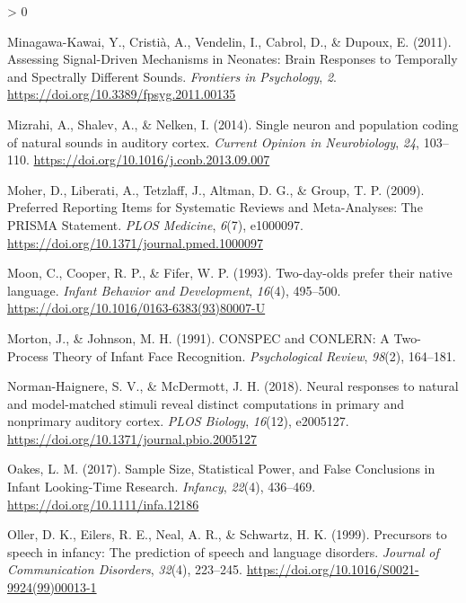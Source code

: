 \documentclass[
  english,
  man]{apa6}
\newlength{\cslhangindent}
\newenvironment{CSLReferences}[2] %
 {%
  \setlength{\parindent}{0pt}
  \ifodd #1 \everypar{\setlength{\hangindent}{\cslhangindent}}\ignorespaces\fi
  \ifnum #2 > 0
  \setlength{\parskip}{#2\baselineskip}
  \fi
 }%
 {}
\begin{document}
\begin{CSLReferences}{1}{0}
\leavevmode\hypertarget{ref-minagawa-kawai_assessing_2011}{}%
Minagawa-Kawai, Y., Cristià, A., Vendelin, I., Cabrol, D., \& Dupoux, E. (2011). Assessing {Signal}-{Driven} {Mechanisms} in {Neonates}: {Brain} {Responses} to {Temporally} and {Spectrally} {Different} {Sounds}. \emph{Frontiers in Psychology}, \emph{2}. \url{https://doi.org/10.3389/fpsyg.2011.00135}

\leavevmode\hypertarget{ref-mizrahi_single_2014}{}%
Mizrahi, A., Shalev, A., \& Nelken, I. (2014). Single neuron and population coding of natural sounds in auditory cortex. \emph{Current Opinion in Neurobiology}, \emph{24}, 103--110. \url{https://doi.org/10.1016/j.conb.2013.09.007}

\leavevmode\hypertarget{ref-moher_preferred_2009}{}%
Moher, D., Liberati, A., Tetzlaff, J., Altman, D. G., \& Group, T. P. (2009). Preferred {Reporting} {Items} for {Systematic} {Reviews} and {Meta}-{Analyses}: {The} {PRISMA} {Statement}. \emph{PLOS Medicine}, \emph{6}(7), e1000097. \url{https://doi.org/10.1371/journal.pmed.1000097}

\leavevmode\hypertarget{ref-moon_two-day-olds_1993}{}%
Moon, C., Cooper, R. P., \& Fifer, W. P. (1993). Two-day-olds prefer their native language. \emph{Infant Behavior and Development}, \emph{16}(4), 495--500. \url{https://doi.org/10.1016/0163-6383(93)80007-U}

\leavevmode\hypertarget{ref-morton_conspec_1991}{}%
Morton, J., \& Johnson, M. H. (1991). {CONSPEC} and {CONLERN}: {A} {Two}-{Process} {Theory} of {Infant} {Face} {Recognition}. \emph{Psychological Review}, \emph{98}(2), 164--181.

\leavevmode\hypertarget{ref-norman-haignere_neural_2018}{}%
Norman-Haignere, S. V., \& McDermott, J. H. (2018). Neural responses to natural and model-matched stimuli reveal distinct computations in primary and nonprimary auditory cortex. \emph{PLOS Biology}, \emph{16}(12), e2005127. \url{https://doi.org/10.1371/journal.pbio.2005127}

\leavevmode\hypertarget{ref-oakes_sample_2017}{}%
Oakes, L. M. (2017). Sample {Size}, {Statistical} {Power}, and {False} {Conclusions} in {Infant} {Looking}-{Time} {Research}. \emph{Infancy}, \emph{22}(4), 436--469. \url{https://doi.org/10.1111/infa.12186}

\leavevmode\hypertarget{ref-oller_precursors_1999}{}%
Oller, D. K., Eilers, R. E., Neal, A. R., \& Schwartz, H. K. (1999). Precursors to speech in infancy: {The} prediction of speech and language disorders. \emph{Journal of Communication Disorders}, \emph{32}(4), 223--245. \url{https://doi.org/10.1016/S0021-9924(99)00013-1}


\end{CSLReferences}
\end{document}
